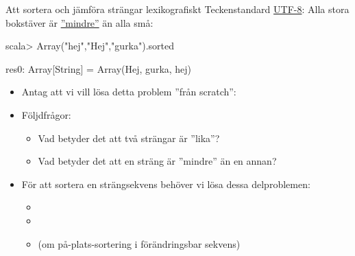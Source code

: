 


\begin{Slide}{Att sortera och jämföra strängar lexikografiskt}\SlideFontSmall
Teckenstandard \href{https://sv.wikipedia.org/wiki/UTF-8}{UTF-8}: Alla stora bokstäver är \href{https://www.youtube.com/watch?v=MijmeoH9LT4}{''mindre''} än alla små:
\begin{REPLnonum}
scala> Array("hej","Hej","gurka").sorted
\end{REPLnonum}
\pause\vspace{-1.2em}
\begin{REPLnonum}
res0: Array[String] = Array(Hej, gurka, hej)\end{REPLnonum}
\pause
\begin{itemize}
\item Antag att vi vill lösa detta problem ''från scratch'': \\ 
\item Följdfrågor:
\begin{itemize}\SlideFontTiny
 \item Vad betyder det att två strängar är ''lika''?
\item Vad betyder det att en sträng är ''mindre'' än en annan?
\end{itemize}
\item För att sortera en strängsekvens behöver vi lösa dessa delproblemen:
\begin{itemize}\SlideFontTiny
\item {} 
\item {}
\item {} (om på-plats-sortering i förändringsbar sekvens)
\end{itemize}
\end{itemize}

\end{Slide}

